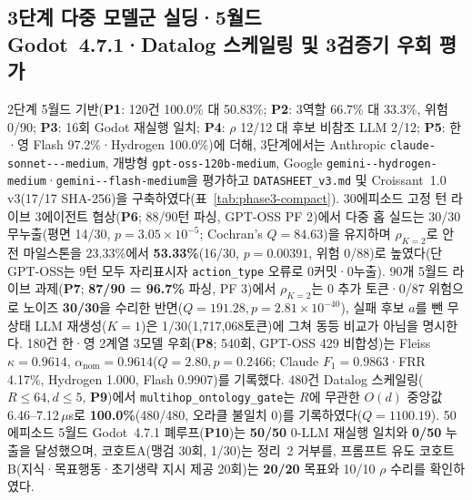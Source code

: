\subsection{3단계 다중 모델군 실딩·5월드 Godot~4.7.1·Datalog 스케일링 및 3검증기 우회 평가}\label{sec:phase3-compact}
2단계 5월드 기반(\textbf{P1}: 120건 100.0\% 대 50.83\%; \textbf{P2}: 3역할 66.7\% 대 33.3\%, 위험 0/90; \textbf{P3}: 16회 Godot 재실행 일치; \textbf{P4}: $\rho$ 12/12 대 후보 비참조 LLM 2/12; \textbf{P5}: 한·영 Flash 97.2\%·Hydrogen 100.0\%)에 더해, 3단계에서는 Anthropic \texttt{claude-\allowbreak sonnet---\allowbreak medium}, 개방형 \texttt{gpt-\allowbreak oss-\allowbreak 120b-\allowbreak medium}, Google \texttt{gemini--\allowbreak hydrogen-\allowbreak medium}·\texttt{gemini--\allowbreak flash-\allowbreak medium}을 평가하고 \texttt{DATASHEET\_v3.md} 및 Croissant~1.0 v3(17/17 SHA-256)을 구축하였다(표~\ref{tab:phase3-compact}). 30에피소드 고정 턴 라이브 3에이전트 협상(\textbf{P6}; 88/90턴 파싱, GPT-OSS PF 2)에서 다중 홉 실드는 30/30 무누출(평면 14/30, $p{=}3.05{\times}10^{-5}$; Cochran's $Q{=}84.63$)을 유지하며 $\rho_{K=2}$로 안전 마일스톤을 23.33\%에서 \textbf{53.33\%}(16/30, $p{=}0.00391$, 위험 0/88)로 높였다(단 GPT-OSS는 9턴 모두 자리표시자 \texttt{action\_type} 오류로 0커밋·0누출). 90개 5월드 라이브 과제(\textbf{P7}; \textbf{87/90 = 96.7\%} 파싱, PF 3)에서 $\rho_{K=2}$는 0 추가 토큰·0/87 위험으로 노이즈 \textbf{30/30}을 수리한 반면($Q{=}191.28, p{=}2.81{\times}10^{-40}$), 실패 후보 $a$를 뺀 무상태 LLM 재생성($K{=}1$)은 1/30(1,717,068토큰)에 그쳐 동등 비교가 아님을 명시한다. 180건 한·영 2계열 3모델 우회(\textbf{P8}; 540회, GPT-OSS 429 비합성)는 Fleiss $\kappa{=}\mathbf{0.9614}$, $\alpha_{\mathrm{nom}}{=}\mathbf{0.9614}$($Q{=}2.80, p{=}0.2466$; Claude $F_1{=}0.9863$·FRR 4.17\%, Hydrogen 1.000, Flash 0.9907)를 기록했다. 480건 Datalog 스케일링($R{\le}64, d{\le}5$, \textbf{P9})에서 \texttt{multihop\_}\allowbreak\texttt{ontology\_}\allowbreak\texttt{gate}는 $R$에 무관한 $O(d)$ 중앙값 6.46--7.12\,$\mu$s로 \textbf{100.0\%}(480/480, 오라클 불일치 0)를 기록하였다($Q{=}1100.19$). 50에피소드 5월드 Godot~4.7.1 폐루프(\textbf{P10})는 \textbf{50/50} 0-LLM 재실행 일치와 \textbf{0/50} 누출을 달성했으며, 코호트A(맹검 30회, 1/30)는 정리~2 거부를, 프롬프트 유도 코호트B(지식·목표행동·초기생략 지시 제공 20회)는 \textbf{20/20} 목표와 10/10 $\rho$ 수리를 확인하였다.


